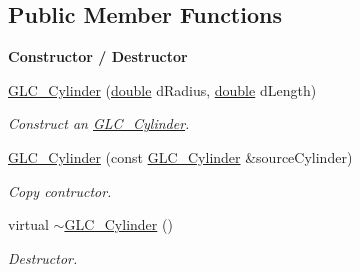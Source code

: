 \subsection*{Public Member Functions}
\begin{Indent}{\bf Constructor / Destructor}\par
\begin{DoxyCompactItemize}
\item 
\hyperlink{class_g_l_c___cylinder_a719e03b04464f0c2d07011b76970a744}{G\-L\-C\-\_\-\-Cylinder} (\hyperlink{_super_l_u_support_8h_a8956b2b9f49bf918deed98379d159ca7}{double} d\-Radius, \hyperlink{_super_l_u_support_8h_a8956b2b9f49bf918deed98379d159ca7}{double} d\-Length)
\begin{DoxyCompactList}\small\item\em Construct an \hyperlink{class_g_l_c___cylinder}{G\-L\-C\-\_\-\-Cylinder}. \end{DoxyCompactList}\item 
\hyperlink{class_g_l_c___cylinder_a3c2f665849cc191b50441deec20af012}{G\-L\-C\-\_\-\-Cylinder} (const \hyperlink{class_g_l_c___cylinder}{G\-L\-C\-\_\-\-Cylinder} \&source\-Cylinder)
\begin{DoxyCompactList}\small\item\em Copy contructor. \end{DoxyCompactList}\item 
virtual \hyperlink{class_g_l_c___cylinder_a305b25156de54007d759c76283586740}{$\sim$\-G\-L\-C\-\_\-\-Cylinder} ()
\begin{DoxyCompactList}\small\item\em Destructor. \end{DoxyCompactList}\end{DoxyCompactItemize}
\end{Indent}
